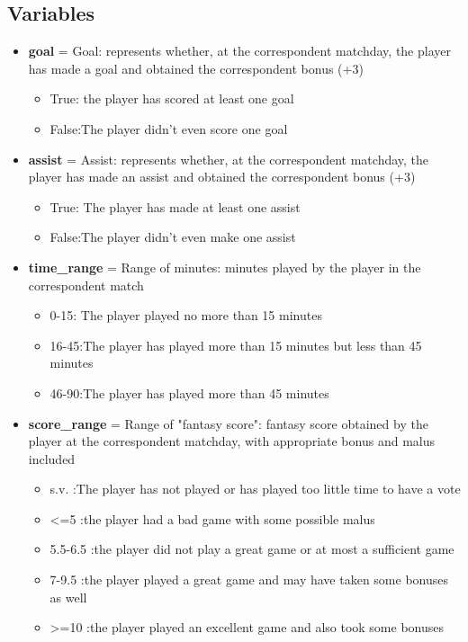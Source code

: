 \documentclass[a4paper,10pt]{report}
\begin{document}
\subsection{Variables}\label{subsec:subsection-411}
\begin{itemize}

    \item \textbf{goal} = Goal: represents whether, at the correspondent matchday, the player has made a goal and obtained the correspondent bonus (+3)
    \begin{itemize}
        \item True: the player has scored at least one goal
        \item False:The player didn't even score one goal
    \end{itemize}
    
    \item \textbf{assist} = Assist: represents whether, at the correspondent matchday, the player has made an assist and obtained the correspondent bonus (+3)
    \begin{itemize}
        \item True: The player has made at least one assist
        \item False:The player didn't even make one assist
    \end{itemize}
    
    \item \textbf{time_range} = Range of minutes: minutes played by the player in the correspondent match
    \begin{itemize}
        \item 0-15: The player played no more than 15 minutes
        \item 16-45:The player has played more than 15 minutes but less than 45 minutes
        \item 46-90:The player has played more than 45 minutes
    \end{itemize}
    
    \item \textbf{score_range} = Range of "fantasy score": fantasy score obtained by the player at the correspondent matchday, with appropriate bonus and malus included 
    \begin{itemize}
        \item s.v. :The player has not played or has played too little time to have a vote
        \item <=5 :the player had a bad game with some possible malus
        \item 5.5-6.5 :the player did not play a great game or at most a sufficient game
        \item 7-9.5 :the player played a great game and may have taken some bonuses as well
        \item >=10 :the player played an excellent game and also took some bonuses
    \end{itemize}
    

\end{itemize}
\end{document}

